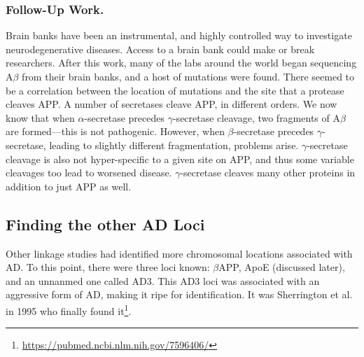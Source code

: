 \subsubsection*{Follow-Up Work.}

Brain banks have been an instrumental, and highly controlled way to investigate neurodegenerative diseases. Access to a brain bank could make or break researchers. After this work, many of the labs around the world began sequencing A$\beta$ from their brain banks, and a host of mutations were found. There seemed to be a correlation between the location of mutations and the site that a protease cleaves APP. A number of secretases cleave APP, in different orders. We now know that when $\alpha$-secretase precedes $\gamma$-secretase cleavage, two fragments of A$\beta$ are formed---this is not pathogenic. However, when $\beta$-secretase precedes $\gamma$-secretase, leading to slightly different fragmentation, problems arise. $\gamma$-secretase cleavage is also not hyper-specific to a given site on APP, and thus some variable cleavages too lead to worsened disease. $\gamma$-secretase cleaves many other proteins in addition to just APP as well.


\subsection*{Finding the other AD Loci}

Other linkage studies had identified more chromosomal locations associated with AD. To this point, there were three loci known: $\beta$APP, ApoE (discussed later), and an unnanmed one called AD3. This AD3 loci was associated with an aggressive form of AD, making it ripe for identification. It was Sherrington et al. in 1995 who finally found it\footnote{\url{https://pubmed.ncbi.nlm.nih.gov/7596406/}}.\newline

